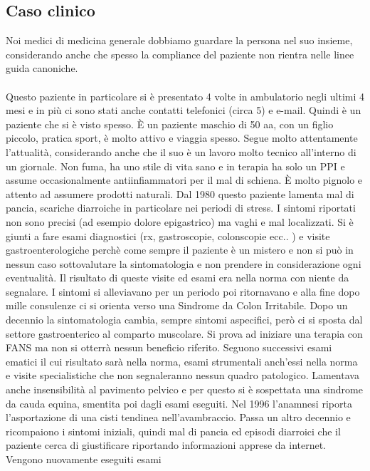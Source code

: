 \subsection{Caso clinico}

Noi medici di medicina generale dobbiamo guardare la persona nel suo
insieme, considerando anche che spesso la compliance del paziente non
rientra nelle linee guida canoniche.
\\\\
Questo paziente in particolare si è presentato 4 volte in ambulatorio
negli ultimi 4 mesi e in più ci sono stati anche contatti telefonici
(circa 5) e e-mail. Quindi è un paziente che si è visto spesso. È un
paziente maschio di 50 aa, con un figlio piccolo, pratica sport, è molto
attivo e viaggia spesso. Segue molto attentamente l'attualità,
considerando anche che il suo è un lavoro molto tecnico all'interno di
un giornale. Non fuma, ha uno stile di vita sano e in terapia ha solo un
PPI e assume occasionalmente antiinfiammatori per il mal di schiena. È
molto pignolo e attento ad assumere prodotti naturali. Dal 1980 questo
paziente lamenta mal di pancia, scariche diarroiche in particolare nei
periodi di stress. I sintomi riportati non sono precisi (ad esempio
dolore epigastrico) ma vaghi e mal localizzati. Si è giunti a fare esami
diagnostici (rx, gastroscopie, colonscopie ecc.. ) e visite
gastroenterologiche perchè come sempre il paziente è un mistero e non si
può in nessun caso sottovalutare la sintomatologia e non prendere in
considerazione ogni eventualità. Il risultato di queste visite ed esami
era nella norma con niente da segnalare. I sintomi si alleviavano per un
periodo poi ritornavano e alla fine dopo mille consulenze ci si orienta
verso una Sindrome da Colon Irritabile. Dopo un decennio la
sintomatologia cambia, sempre sintomi aspecifici, però ci si sposta dal
settore gastroenterico al comparto muscolare. Si prova ad iniziare una
terapia con FANS ma non si otterrà nessun beneficio riferito. Seguono
successivi esami ematici il cui risultato sarà nella norma, esami
strumentali anch'essi nella norma e visite specialistiche che non
segnaleranno nessun quadro patologico. Lamentava anche insensibilità al
pavimento pelvico e per questo si è sospettata una sindrome da cauda
equina, smentita poi dagli esami eseguiti. Nel 1996 l'anamnesi riporta
l'asportazione di una cisti tendinea nell'avambraccio. Passa un altro
decennio e ricompaiono i sintomi iniziali, quindi mal di pancia ed
episodi diarroici che il paziente cerca di giustificare riportando
informazioni apprese da internet. Vengono nuovamente eseguiti esami
